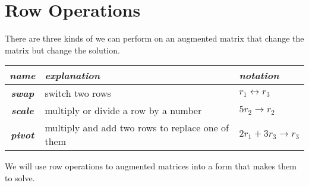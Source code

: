 \section{Row Operations}

There are three kinds of  
we can perform on an augmented matrix
that change the matrix but   change the solution.
\begin{center}
  \large
  \begin{tabular}{c|l|l}
    {\normalsize\itshape name} & 
    {\normalsize\itshape explanation} & 
    {\normalsize\itshape notation} \\
    \hline\hline
    {\bfseries\itshape swap}  
      & switch two rows 
      & $r_1 \longleftrightarrow r_3$ \\
    {\bfseries\itshape scale} 
      & multiply or divide a row by a number 
      & $5r_2 \longrightarrow r_2$ \\
    {\bfseries\itshape pivot} 
      & multiply and add two rows to replace one of them 
      & $2r_1 + 3r_3 \longrightarrow r_3$ \\
  \end{tabular}
\end{center}

\begin{tcolorbox}[center,width=6in]
  We will use row operations to  augmented matrices
  into a form that makes them   
  to solve.
\end{tcolorbox}
